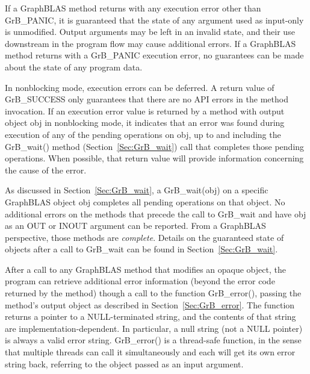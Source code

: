 If a GraphBLAS method returns with any execution error other than 
{\sf GrB\_PANIC}, it is guaranteed that the state of any argument used as 
input-only is unmodified.  Output arguments may be left in an invalid state, 
and their use downstream in the program flow may cause additional errors.  If a 
GraphBLAS method returns with a {\sf GrB\_PANIC} execution error, no guarantees 
can be made about the state of any program data. 

In nonblocking mode, execution errors can be deferred.  A return value
of {\sf GrB\_SUCCESS} only guarantees that there are no API errors
in the method invocation.  If an execution error value is returned
by a method with output object {\sf obj} in nonblocking mode, it
indicates that an error was found during execution of any of the pending
operations on {\sf obj}, up to and including the {\sf GrB\_wait()} method
(Section~\ref{Sec:GrB_wait}) call that completes those pending operations.
When possible, that return value will provide information concerning
the cause of the error.

As discussed in Section~\ref{Sec:GrB_wait}, a {\sf GrB\_wait(obj)} on a
specific GraphBLAS object {\sf obj} completes all pending operations on
that object.  No additional errors on the methods that precede the call
to {\sf GrB\_wait} and have {\sf obj} as an {\sf OUT} or {\sf INOUT}
argument can be reported.  From a GraphBLAS perspective, those methods
are {\em complete}.  Details on the guaranteed state of objects after
a call to {\sf GrB\_wait} can be found in Section~\ref{Sec:GrB_wait}.

After a call to any GraphBLAS method {\color{red} that modifies an opaque object}, the 
program can retrieve additional error information (beyond the error code 
returned by the method) though a call to the function {\sf GrB\_error()}, 
{\color{red} passing the method's output object} as 
described in Section~\ref{Sec:GrB_error}.  The function returns a
pointer to a NULL-terminated string, and the contents of that string
are implementation-dependent. In particular, a null string (not a {\sf
NULL} pointer) is always a valid error string.  {\sf GrB\_error()} is
a thread-safe function, in the sense that multiple threads can call it
simultaneously and each will get its own error string back, referring
to the object passed as an input argument.
